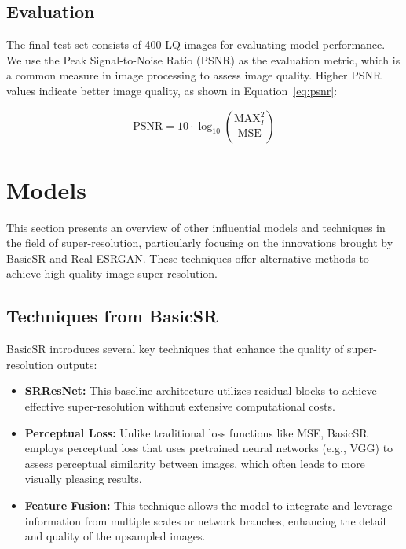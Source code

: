 \documentclass{article}
\begin{document}
\subsection{Evaluation}
\label{subsec:evaluation}

The final test set consists of 400 LQ images for evaluating model performance. We use the Peak Signal-to-Noise Ratio (PSNR) as the evaluation metric, which is a common measure in image processing to assess image quality. Higher PSNR values indicate better image quality, as shown in Equation~\ref{eq:psnr}:

\begin{equation}
    \text{PSNR} = 10 \cdot \log_{10} \left( \frac{\text{MAX}_I^2}{\text{MSE}} \right)
    \label{eq:psnr}
\end{equation}


\section{Models}
\label{sec:Models}%

This section presents an overview of other influential models and techniques in the field of super-resolution, particularly focusing on the innovations brought by BasicSR and Real-ESRGAN. These techniques offer alternative methods to achieve high-quality image super-resolution.

\subsection{Techniques from BasicSR}
\label{subsec:BasicSR}%

BasicSR introduces several key techniques that enhance the quality of super-resolution outputs:

\begin{itemize}
    \item \textbf{SRResNet:} This baseline architecture utilizes residual blocks to achieve effective super-resolution without extensive computational costs.
    \item \textbf{Perceptual Loss:} Unlike traditional loss functions like MSE, BasicSR employs perceptual loss that uses pretrained neural networks (e.g., VGG) to assess perceptual similarity between images, which often leads to more visually pleasing results.
    \item \textbf{Feature Fusion:} This technique allows the model to integrate and leverage information from multiple scales or network branches, enhancing the detail and quality of the upsampled images.
\end{itemize}
\end{document}
